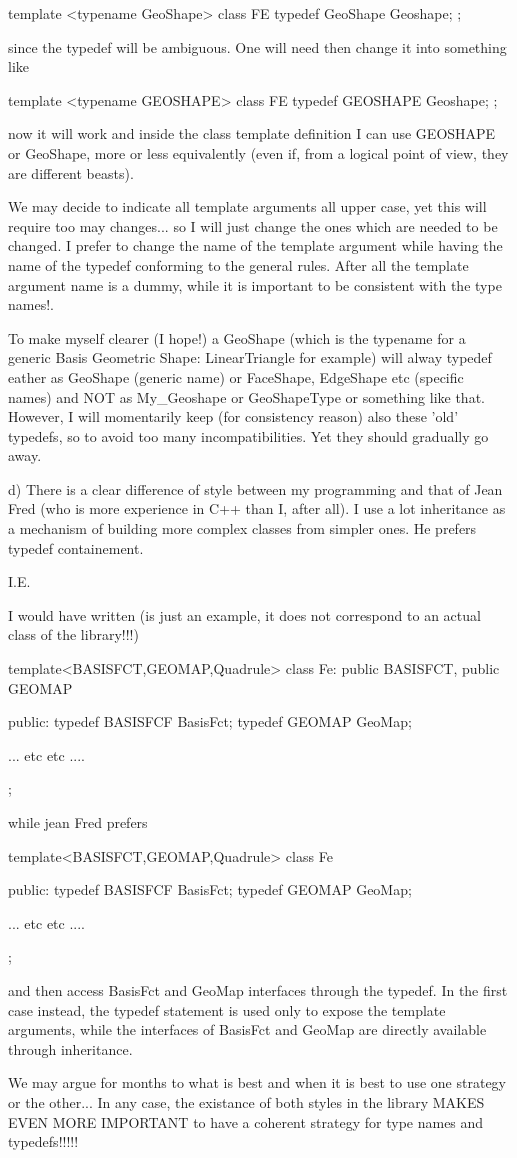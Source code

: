 template <typename GeoShape>
class FE{
typedef GeoShape Geoshape;
};

since the typedef will be ambiguous. One will need then change it into
something like

template <typename GEOSHAPE>
class FE{
        typedef GEOSHAPE Geoshape;
};

now it will work and inside the class template definition I can use
GEOSHAPE or GeoShape, more or less equivalently (even if, from a
logical point of view, they are different beasts).

We may decide to indicate all template arguments all upper case, yet
this will require too may changes... so I will just change the ones
which are needed to be changed. I prefer to change the name of the
template argument while having the name of the typedef conforming to the general
rules. After all the template argument name is a dummy, while it is
important to be consistent with the type names!.

To make myself clearer (I hope!) a GeoShape (which is the typename for a
generic Basis Geometric Shape: LinearTriangle for example) will alway
typedef eather as GeoShape (generic name) or FaceShape, EdgeShape etc
(specific names) and NOT as My\_Geoshape or GeoShapeType or something
like that. However, I will momentarily keep (for consistency reason)
also these 'old' typedefs, so to avoid too many incompatibilities. Yet
they should gradually go away.

d) There is a clear difference of style between my programming and that
of Jean Fred (who is more experience in C++ than I, after all). I use a
lot inheritance as a mechanism of building more complex classes from
simpler ones. He prefers typedef containement.

I.E.

I would have written (is just an example, it does not correspond to an
actual class of the library!!!)

template<BASISFCT,GEOMAP,Quadrule>
class Fe: public BASISFCT, public GEOMAP
{
public:
typedef BASISFCF BasisFct;
typedef GEOMAP GeoMap;

... etc etc ....
};

while jean Fred prefers

template<BASISFCT,GEOMAP,Quadrule>
class Fe
{
public:
typedef BASISFCF BasisFct;
typedef GEOMAP GeoMap;

... etc etc ....
};

and then access BasisFct and GeoMap interfaces through the typedef.  In
the first case instead, the typedef statement is used only to expose the
template arguments, while the interfaces of BasisFct and GeoMap are
directly available through inheritance.

We may argue for months to what is best and when it is best to use one
strategy or the other... In any case, the existance of both styles in
the library MAKES EVEN MORE IMPORTANT to have a coherent strategy for
type names and typedefs!!!!!
